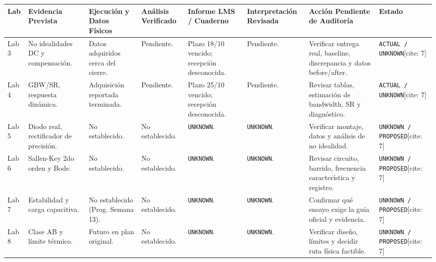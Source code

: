 \documentclass[10pt, a4paper, landscape]{article}
\begin{document}
\begin{table}[htbp]
    \centering
    \scriptsize
    \renewcommand{\arraystretch}{1.4}
    \begin{tabularx}{\textwidth}{|P{0.9cm}|P{2.8cm}|P{2.3cm}|P{2.3cm}|P{2.2cm}|P{2.2cm}|P{3.5cm}|Y|}
    \hline
    \textbf{Lab} & \textbf{Evidencia Prevista} & \textbf{Ejecución y Datos Físicos} & \textbf{Análisis Verificado} & \textbf{Informe LMS / Cuaderno} & \textbf{Interpretación Revisada} & \textbf{Acción Pendiente de Auditoría} & \textbf{Estado} \\ \hline
    Lab 3 & No idealidades DC y compensación. & Datos adquiridos cerca del cierre. & Pendiente. & Plazo 18/10 vencido; recepción desconocida. & Pendiente. & Verificar entrega real, baseline, discrepancia y datos before/after. & \texttt{ACTUAL / UNKNOWN}[cite: 7] \\ \hline
    Lab 4 & GBW/SR, respuesta dinámica. & Adquisición reportada terminada. & Pendiente. & Plazo 25/10 vencido; recepción desconocida. & Pendiente. & Revisar tablas, estimación de bandwidth, SR y diagnóstico. & \texttt{ACTUAL / UNKNOWN}[cite: 7] \\ \hline
    Lab 5 & Diodo real, rectificador de precisión. & No establecido. & No establecido. & \texttt{UNKNOWN}. & \texttt{UNKNOWN}. & Verificar montaje, datos y análisis de no idealidad. & \texttt{UNKNOWN / PROPOSED}[cite: 7] \\ \hline
    Lab 6 & Sallen-Key 2do orden y Bode. & No establecido. & No establecido. & \texttt{UNKNOWN}. & \texttt{UNKNOWN}. & Revisar circuito, barrido, frecuencia característica y registro. & \texttt{UNKNOWN / PROPOSED}[cite: 7] \\ \hline
    Lab 7 & Estabilidad y carga capacitiva. & No establecido (Prog. Semana 13). & No establecido. & \texttt{UNKNOWN}. & \texttt{UNKNOWN}. & Confirmar qué ensayo exige la guía oficial y evidencia. & \texttt{UNKNOWN / PROPOSED}[cite: 7] \\ \hline
    Lab 8 & Clase AB y límite térmico. & Futuro en plan original. & No establecido. & \texttt{UNKNOWN}. & \texttt{UNKNOWN}. & Verificar diseño, límites y decidir ruta física factible. & \texttt{UNKNOWN / PROPOSED}[cite: 7] \\ \hline
    \end{tabularx}
\end{table}
\end{document}
